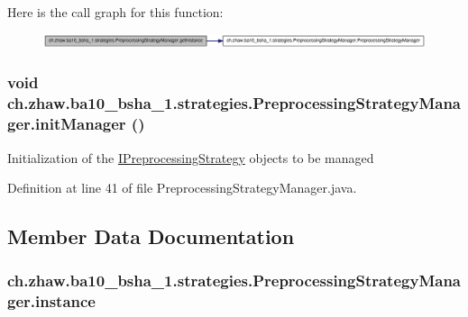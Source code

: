 Here is the call graph for this function:\nopagebreak
\begin{figure}[H]
\begin{center}
\leavevmode
\includegraphics[width=420pt]{classch_1_1zhaw_1_1ba10__bsha__1_1_1strategies_1_1PreprocessingStrategyManager_a735eb5e52177dd2ce40e0f4046682e8b_cgraph}
\end{center}
\end{figure}
\hypertarget{classch_1_1zhaw_1_1ba10__bsha__1_1_1strategies_1_1PreprocessingStrategyManager_a98df5bed9cdf63350bd5d87ab24f7f1e}{
\subsubsection[{initManager}]{\setlength{\rightskip}{0pt plus 5cm}void ch.zhaw.ba10\_\-bsha\_\-1.strategies.PreprocessingStrategyManager.initManager ()}}
\label{classch_1_1zhaw_1_1ba10__bsha__1_1_1strategies_1_1PreprocessingStrategyManager_a98df5bed9cdf63350bd5d87ab24f7f1e}
Initialization of the \hyperlink{interfacech_1_1zhaw_1_1ba10__bsha__1_1_1strategies_1_1IPreprocessingStrategy}{IPreprocessingStrategy} objects to be managed 

Definition at line 41 of file PreprocessingStrategyManager.java.

\subsection{Member Data Documentation}
\hypertarget{classch_1_1zhaw_1_1ba10__bsha__1_1_1strategies_1_1PreprocessingStrategyManager_aaaf08a9a23741085373f5b169191ac01}{
\subsubsection[{instance}]{ {\bf ch.zhaw.ba10\_\-bsha\_\-1.strategies.PreprocessingStrategyManager.instance}}}
\label{classch_1_1zhaw_1_1ba10__bsha__1_1_1strategies_1_1PreprocessingStrategyManager_aaaf08a9a23741085373f5b169191ac01}


